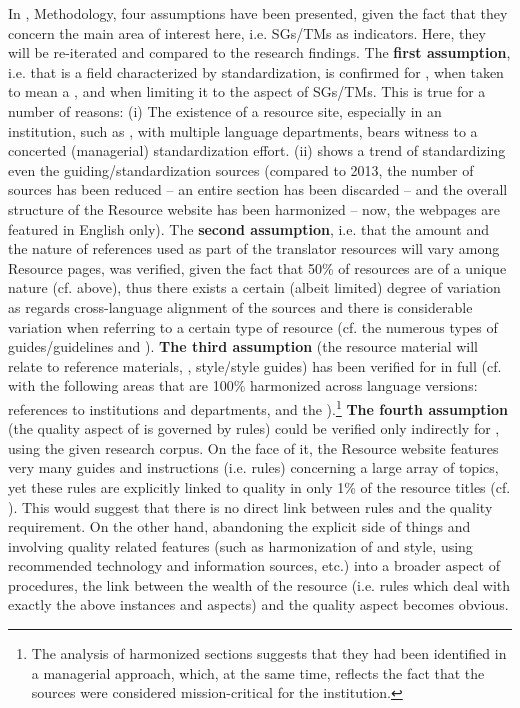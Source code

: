 \documentclass[output=paper]{langsci/langscibook}
\begin{document}
In , Methodology, four assumptions have been presented, given the fact that they concern the main area of interest here, i.e. SGs/TMs as  indicators. Here, they will be re-iterated and compared to the research findings. The \textbf{first assumption}, i.e. that  is a field characterized by standardization, is confirmed for , when taken to mean a , and when limiting it to the aspect of SGs/TMs. This is true for a number of reasons: (i) The existence of a resource site, especially in an institution, such as , with multiple language departments, bears witness to a concerted (managerial) standardization effort. (ii)  shows a trend of standardizing even the guiding/standardization sources (compared to 2013, the number of sources has been reduced – an entire section has been discarded – and the overall structure of the Resource website has been harmonized – now, the webpages are featured in English only). The \textbf{second assumption}, i.e. that the amount and the nature of references used as part of the translator resources will vary among Resource pages, was verified, given the fact that 50\% of resources are of a unique nature (cf.  above), thus there exists a certain (albeit limited) degree of variation as regards cross-language alignment of the sources and there is considerable variation when referring to a certain type of resource (cf. the numerous types of guides/guidelines and ). \textbf{The third assumption} (the resource material will relate to reference materials, , style/style guides) has been verified for  in full (cf.  with the following areas that are 100\% harmonized across language versions: references to  institutions and  departments,  and the ).\footnote{The analysis of harmonized sections suggests that they had been identified in a managerial approach, which, at the same time, reflects the fact that the sources were considered mission-critical for the institution.} \textbf{The fourth assumption} (the quality aspect of  is governed by rules) could be verified only indirectly for , using the given research corpus. On the face of it, the Resource website features very many guides and instructions (i.e. rules) concerning a large array of topics, yet these rules are explicitly linked to quality in only 1\% of the resource titles (cf. ). This would suggest that there is no direct link between rules and the quality requirement. On the other hand, abandoning the explicit side of things and involving quality related features (such as harmonization of  and style, using recommended technology and information sources, etc.) into a broader aspect of  procedures, the link between the wealth of the  resource (i.e. rules which deal with exactly the above instances and aspects) and the quality aspect becomes obvious.
\end{document}
